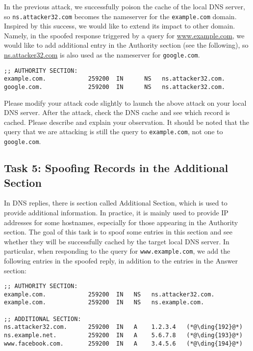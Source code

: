 In the previous attack, we successfully poison the cache of the local DNS
server, so \texttt{ns.attacker32.com} becomes the nameserver for the 
\texttt{example.com} domain. Inspired by this success, we would like to 
extend its impact to other domain. Namely, 
in the spoofed response triggered by a query for
\url{www.example.com}, we would like to add additional entry
in the Authority section (see the following), so
\url{ns.attacker32.com} is also used as the nameserver for 
\texttt{google.com}.  


\begin{lstlisting}
;; AUTHORITY SECTION:
example.com.            259200  IN      NS   ns.attacker32.com.
google.com.             259200  IN      NS   ns.attacker32.com.
\end{lstlisting}

Please modify your attack code slightly to launch 
the above attack on your local DNS server. After the 
attack, check the DNS cache and see which record is cached.
Please describe and explain your observation. It should be noted that the query
that we are attacking is still the query to \texttt{example.com}, not one
to \texttt{google.com}.  


\subsection{Task 5: Spoofing Records in the Additional Section}

In DNS replies, there is section called Additional Section, which is used
to provide additional information. In practice, it is mainly used to
provide IP addresses for some hostnames, especially for those appearing in the
Authority section. The goal of this task is to spoof some entries 
in this section and see whether they will be successfully cached by the
target local DNS server. In particular, when responding to 
the query for \texttt{www.example.com}, we add the following entries 
in the spoofed reply, in addition to the entries in the Answer section:


\begin{lstlisting}
;; AUTHORITY SECTION:
example.com.            259200  IN   NS   ns.attacker32.com.
example.com.            259200  IN   NS   ns.example.com.

;; ADDITIONAL SECTION:
ns.attacker32.com.      259200  IN   A    1.2.3.4   (*@\ding{192}@*)
ns.example.net.         259200  IN   A    5.6.7.8   (*@\ding{193}@*)
www.facebook.com.       259200  IN   A    3.4.5.6   (*@\ding{194}@*)
\end{lstlisting}

